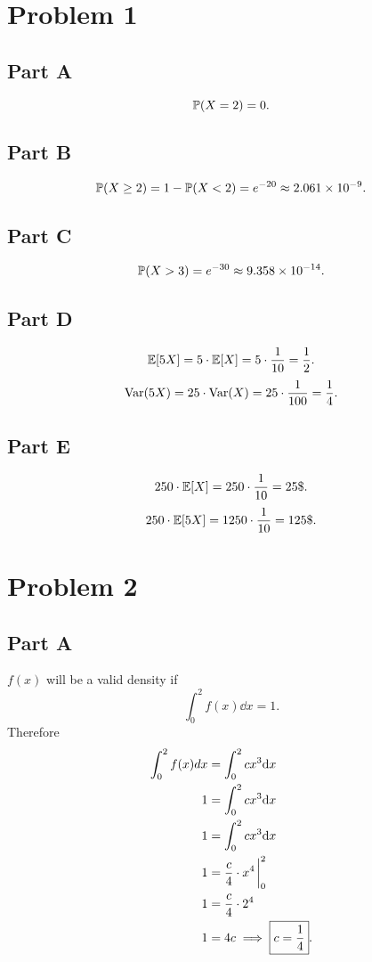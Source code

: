 \documentclass[12pt]{extarticle}
\begin{document}
\section*{Problem 1}
\subsection*{Part A}
\[
	\mathbb{P}\qty(X = 2) = 0
.\]

\subsection*{Part B}
\[
	\mathbb{P}\qty(X \geq 2) = 1 - \mathbb{P}\qty(X < 2) = e^{-20} \approx 2.061 \times 10^{-9}
.\]

\subsection*{Part C}
\[
	\mathbb{P}\qty(X > 3) = e^{-30} \approx 9.358 \times 10^{-14}
.\]

\subsection*{Part D}
\[
	\mathbb{E}\qty[5X] = 5 \cdot \mathbb{E}\qty[X] = 5\cdot \frac{1}{10} = \frac{1}{2}
.\]
\[
	\text{Var}\qty(5X) = 25 \cdot \text{Var}\qty(X) = 25 \cdot \frac{1}{100} = \frac{1}{4}
.\]

\subsection*{Part E}
\[
	250\cdot\mathbb{E}\qty[X] = 250\cdot \frac{1}{10} = 25\$
.\]
\[
	250\cdot\mathbb{E}\qty[5X] = 1250\cdot \frac{1}{10} = 125\$
.\]

\section*{Problem 2}
\subsection*{Part A}
$f(x)$ will be a valid density if
\[
	\int_0^2 f(x) \dd x = 1
.\]
Therefore
\begin{align*}
	\int_0^2 f(x) dx &= \int_0^2 cx^3 \dd x \\
	1 &= \int_0^2 cx^3 \dd x \\
	1 &= \int_0^2 cx^3 \dd x \\
	1 &= \frac{c}{4}\cdot x^4 \eval_0^2 \\
	1 &= \frac{c}{4}\cdot 2^4 \\
	1 &= 4c \implies \boxed{c = \frac{1}{4}}
.\end{align*}
\end{document}
